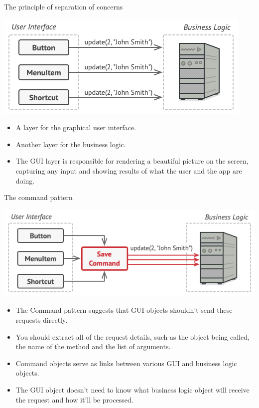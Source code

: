 \documentclass[13pt]{beamer}
\begin{document}
\begin{frame}{The principle of separation of concerns}
	\begin{center}
		\includegraphics[scale=0.5]{./images/solution1.png}
	\end{center}
	\begin{itemize}
		\item A layer for the graphical user interface.
		\item Another layer for the business logic.
		\item The GUI layer is responsible for rendering a beautiful picture on the screen, capturing any input and showing results of what the user and the app are doing.
	\end{itemize}
\end{frame}

\begin{frame}{The command pattern}
	\begin{center}
		\includegraphics[scale=0.5]{./images/solution.png}
	\end{center}
	\begin{itemize}
		\item The Command pattern suggests that GUI objects shouldn’t send these requests directly.
		\item You should extract all of the request details, such as the object being called, the name of the method and the list of arguments.
		\item Command objects serve as links between various GUI and business logic objects.
		\item The GUI object doesn’t need to know what business logic object will receive the request and how it’ll be processed.
	\end{itemize}
\end{frame}
\end{document}
